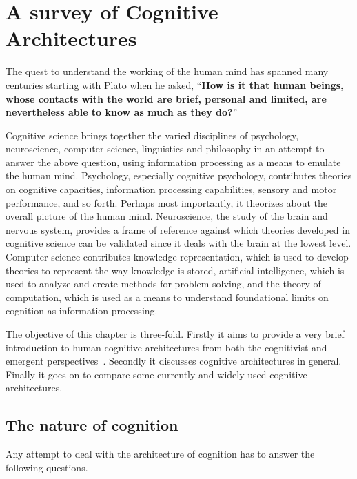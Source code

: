 \chapter{A survey of Cognitive Architectures}
\label{The_nature_of_cognition}
\newcommand{\soar}{{\small Soar\ }}
\newcommand{\actr}{{\small ACT-R\ }}
\newcommand{\epic}{{\small EPIC\ }}
\newcommand{\clarion}{{\small CLARION\ }}
The quest to understand the working of the human mind has spanned
many centuries starting with Plato when he asked, 
%
%
``{\bf How is it that human beings, whose contacts with the world are
  brief, personal and limited, are nevertheless able to know as much
  as they do?}''~\cite{Bogdan:1993aa}

Cognitive science brings together the varied disciplines of
psychology, neuroscience, computer science, linguistics and philosophy
in an attempt to answer the above question, using information
processing as a means to emulate the human mind. Psychology,
especially cognitive psychology, contributes theories on cognitive
capacities, information processing capabilities, sensory and motor
performance, and so forth.  Perhaps most importantly, it theorizes
about the overall picture of the human mind. Neuroscience, the study
of the brain and nervous system, provides a frame of reference against
which theories developed in cognitive science can be validated since
it deals with the brain at the lowest level.
% 
%
Computer science contributes knowledge representation, which is used
to develop theories to represent the way knowledge is stored,
artificial intelligence, which is used to analyze and create methods
for problem solving, and the theory of computation, which is used as a
means to understand foundational limits on cognition as
information processing.

The objective of this chapter is three-fold.  Firstly it aims to
provide a very brief introduction to human cognitive architectures
from both the cognitivist and emergent
perspectives~\cite{DBLP:journals/tec/VernonMS07}.  Secondly it
discusses cognitive architectures in general.  Finally it goes on to
compare some currently and widely used cognitive architectures.

\section{The nature of cognition}
\label{nature_Of_Cognition}
Any attempt to deal with the architecture of cognition has to answer
the following questions.

